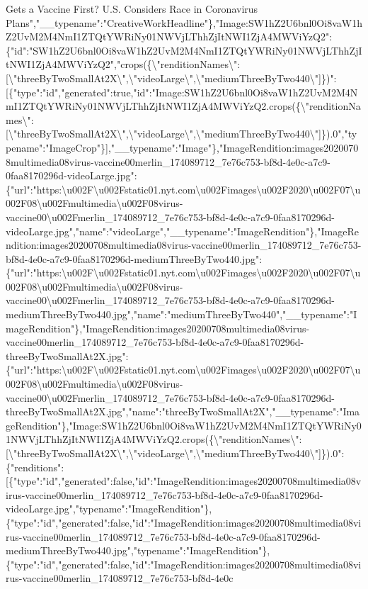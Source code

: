 Gets a Vaccine First? U.S. Considers Race in Coronavirus
Plans","\_\_typename":"CreativeWorkHeadline"\},"Image:SW1hZ2U6bnl0Oi8vaW1hZ2UvM2M4NmI1ZTQtYWRiNy01NWVjLThhZjItNWI1ZjA4MWViYzQ2":\{"id":"SW1hZ2U6bnl0Oi8vaW1hZ2UvM2M4NmI1ZTQtYWRiNy01NWVjLThhZjItNWI1ZjA4MWViYzQ2","crops(\{\textbackslash{}"renditionNames\textbackslash{}":{[}\textbackslash{}"threeByTwoSmallAt2X\textbackslash{}",\textbackslash{}"videoLarge\textbackslash{}",\textbackslash{}"mediumThreeByTwo440\textbackslash{}"{]}\})":{[}\{"type":"id","generated":true,"id":"Image:SW1hZ2U6bnl0Oi8vaW1hZ2UvM2M4NmI1ZTQtYWRiNy01NWVjLThhZjItNWI1ZjA4MWViYzQ2.crops(\{\textbackslash{}"renditionNames\textbackslash{}":{[}\textbackslash{}"threeByTwoSmallAt2X\textbackslash{}",\textbackslash{}"videoLarge\textbackslash{}",\textbackslash{}"mediumThreeByTwo440\textbackslash{}"{]}\}).0","typename":"ImageCrop"\}{]},"\_\_typename":"Image"\},"ImageRendition:images20200708multimedia08virus-vaccine00merlin\_174089712\_7e76c753-bf8d-4e0c-a7c9-0faa8170296d-videoLarge.jpg":\{"url":"https:\textbackslash{}u002F\textbackslash{}u002Fstatic01.nyt.com\textbackslash{}u002Fimages\textbackslash{}u002F2020\textbackslash{}u002F07\textbackslash{}u002F08\textbackslash{}u002Fmultimedia\textbackslash{}u002F08virus-vaccine00\textbackslash{}u002Fmerlin\_174089712\_7e76c753-bf8d-4e0c-a7c9-0faa8170296d-videoLarge.jpg","name":"videoLarge","\_\_typename":"ImageRendition"\},"ImageRendition:images20200708multimedia08virus-vaccine00merlin\_174089712\_7e76c753-bf8d-4e0c-a7c9-0faa8170296d-mediumThreeByTwo440.jpg":\{"url":"https:\textbackslash{}u002F\textbackslash{}u002Fstatic01.nyt.com\textbackslash{}u002Fimages\textbackslash{}u002F2020\textbackslash{}u002F07\textbackslash{}u002F08\textbackslash{}u002Fmultimedia\textbackslash{}u002F08virus-vaccine00\textbackslash{}u002Fmerlin\_174089712\_7e76c753-bf8d-4e0c-a7c9-0faa8170296d-mediumThreeByTwo440.jpg","name":"mediumThreeByTwo440","\_\_typename":"ImageRendition"\},"ImageRendition:images20200708multimedia08virus-vaccine00merlin\_174089712\_7e76c753-bf8d-4e0c-a7c9-0faa8170296d-threeByTwoSmallAt2X.jpg":\{"url":"https:\textbackslash{}u002F\textbackslash{}u002Fstatic01.nyt.com\textbackslash{}u002Fimages\textbackslash{}u002F2020\textbackslash{}u002F07\textbackslash{}u002F08\textbackslash{}u002Fmultimedia\textbackslash{}u002F08virus-vaccine00\textbackslash{}u002Fmerlin\_174089712\_7e76c753-bf8d-4e0c-a7c9-0faa8170296d-threeByTwoSmallAt2X.jpg","name":"threeByTwoSmallAt2X","\_\_typename":"ImageRendition"\},"Image:SW1hZ2U6bnl0Oi8vaW1hZ2UvM2M4NmI1ZTQtYWRiNy01NWVjLThhZjItNWI1ZjA4MWViYzQ2.crops(\{\textbackslash{}"renditionNames\textbackslash{}":{[}\textbackslash{}"threeByTwoSmallAt2X\textbackslash{}",\textbackslash{}"videoLarge\textbackslash{}",\textbackslash{}"mediumThreeByTwo440\textbackslash{}"{]}\}).0":\{"renditions":{[}\{"type":"id","generated":false,"id":"ImageRendition:images20200708multimedia08virus-vaccine00merlin\_174089712\_7e76c753-bf8d-4e0c-a7c9-0faa8170296d-videoLarge.jpg","typename":"ImageRendition"\},\{"type":"id","generated":false,"id":"ImageRendition:images20200708multimedia08virus-vaccine00merlin\_174089712\_7e76c753-bf8d-4e0c-a7c9-0faa8170296d-mediumThreeByTwo440.jpg","typename":"ImageRendition"\},\{"type":"id","generated":false,"id":"ImageRendition:images20200708multimedia08virus-vaccine00merlin\_174089712\_7e76c753-bf8d-4e0c